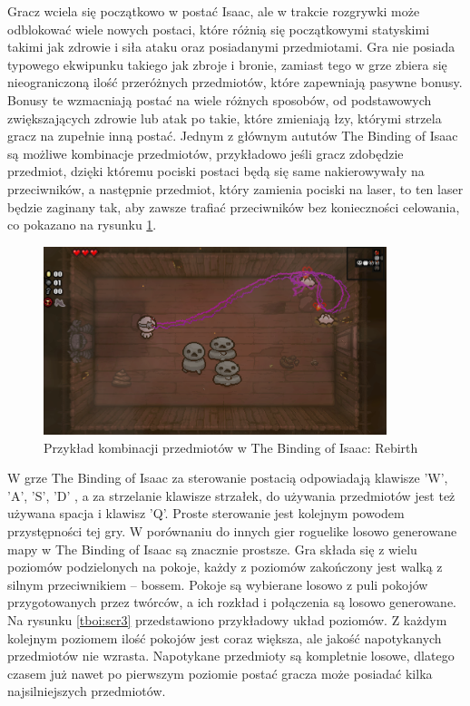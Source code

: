 \documentclass[12pt,twoside]{article}
\begin{document}
Gracz wciela się początkowo w postać Isaac, ale w trakcie rozgrywki może odblokować wiele nowych postaci, które różnią się początkowymi statyskimi takimi jak zdrowie i siła ataku oraz posiadanymi przedmiotami. Gra nie posiada typowego ekwipunku takiego jak zbroje i bronie, zamiast tego w grze zbiera się nieograniczoną ilość przeróżnych przedmiotów, które zapewniają pasywne bonusy. Bonusy te wzmacniają postać na wiele różnych sposobów, od podstawowych zwiększających zdrowie lub atak po takie, które zmieniają łzy, którymi strzela gracz na zupełnie inną postać. Jednym z głównym aututów The Binding of Isaac są możliwe kombinacje przedmiotów, przykładowo jeśli gracz zdobędzie przedmiot, dzięki któremu pociski postaci będą się same nakierowywały na przeciwników, a następnie przedmiot, który zamienia pociski na laser, to ten laser będzie zaginany tak, aby zawsze trafiać przeciwników bez konieczności celowania, co pokazano na rysunku \ref{tboi:scr2}.


\FloatBarrier
\begin{figure}[h]
	\centering
	\includegraphics[width=10cm]{images/tboi/scr2.png}
	\caption{Przykład kombinacji przedmiotów w The Binding of Isaac: Rebirth}
	\label{tboi:scr2}
\end{figure}
\FloatBarrier

W grze The Binding of Isaac za sterowanie postacią odpowiadają klawisze 'W', 'A', 'S', 'D' , a za strzelanie klawisze strzałek, do używania przedmiotów jest też używana spacja i klawisz 'Q'. Proste sterowanie jest kolejnym powodem przystępności tej gry.
 W porównaniu do innych gier roguelike losowo generowane mapy w The Binding of Isaac są znacznie prostsze. Gra składa się z wielu poziomów podzielonych na pokoje, każdy z poziomów zakończony jest walką z silnym przeciwnikiem -- bossem. Pokoje są wybierane losowo z puli pokojów przygotowanych przez twórców, a ich rozkład i połączenia są losowo generowane. Na rysunku \ref{tboi:scr3} przedstawiono przykładowy układ poziomów. Z każdym kolejnym poziomem ilość pokojów jest coraz większa, ale jakość napotykanych przedmiotów nie wzrasta. Napotykane przedmioty są kompletnie losowe, dlatego czasem już nawet po pierwszym poziomie postać gracza może posiadać kilka najsilniejszych przedmiotów. 
\end{document}
